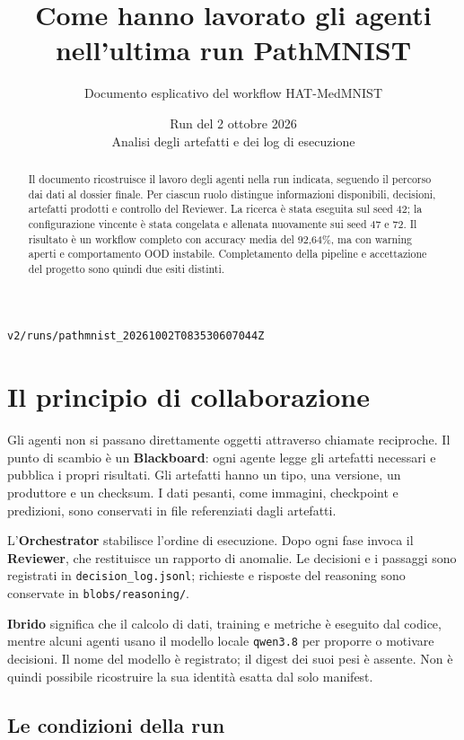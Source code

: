 \documentclass[11pt,a4paper]{article}
\title{Come hanno lavorato gli agenti\\nell'ultima run PathMNIST}
\author{Documento esplicativo del workflow HAT-MedMNIST}
\date{Run del 2 ottobre 2026\\Analisi degli artefatti e dei log di esecuzione}
\newcommand{\artefatto}[1]{\nolinkurl{#1}}
\newcommand{\file}[1]{\nolinkurl{#1}}
\begin{document}
\maketitle

\begin{center}
\small\file{v2/runs/pathmnist_20261002T083530607044Z}
\end{center}

\begin{abstract}
Il documento ricostruisce il lavoro degli agenti nella run indicata, seguendo
il percorso dai dati al dossier finale. Per ciascun ruolo distingue informazioni
disponibili, decisioni, artefatti prodotti e controllo del Reviewer. La ricerca
è stata eseguita sul seed 42; la configurazione vincente è stata congelata e
allenata nuovamente sui seed 47 e 72. Il risultato è un workflow completo con
accuracy media del 92,64\%, ma con warning aperti e comportamento OOD instabile.
Completamento della pipeline e accettazione del progetto sono quindi due esiti distinti.
\end{abstract}

\tableofcontents
\newpage

\section{Il principio di collaborazione}

Gli agenti non si passano direttamente oggetti attraverso chiamate reciproche.
Il punto di scambio è un \textbf{Blackboard}: ogni agente legge gli artefatti
necessari e pubblica i propri risultati. Gli artefatti hanno un tipo, una
versione, un produttore e un checksum. I dati pesanti, come immagini,
checkpoint e predizioni, sono conservati in file referenziati dagli artefatti.

L'\textbf{Orchestrator} stabilisce l'ordine di esecuzione. Dopo ogni fase invoca
il \textbf{Reviewer}, che restituisce un rapporto di anomalie. Le decisioni e
i passaggi sono registrati in \file{decision_log.jsonl}; richieste e risposte
del reasoning sono conservate in \file{blobs/reasoning/}.

\textbf{Ibrido} significa che il calcolo di dati, training e metriche è eseguito
dal codice, mentre alcuni agenti usano il modello locale \artefatto{qwen3.8}
per proporre o motivare decisioni. Il nome del modello è registrato; il digest
dei suoi pesi è assente. Non è quindi possibile ricostruire la sua identità
esatta dal solo manifest.

\subsection{Le condizioni della run}
\end{document}
